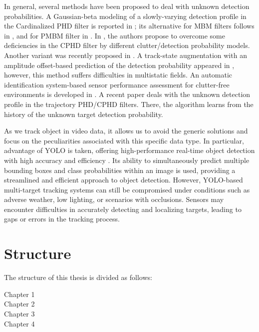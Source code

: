 In general, several methods have been proposed to deal with unknown detection probabilities. A Gaussian-beta modeling of a slowly-varying detection profile in the Cardinalized PHD filter is reported in \cite{Mahler2011cphd}; its alternative for MBM filters follows in \cite{Vo2013Robust}, and for PMBM filter in \cite{Kong2021Robust}. In \cite{Li2018PHD}, the authors propose to overcome some deficiencies in the CPHD filter \cite{Mahler2011cphd} by different clutter/detection probability models. Another variant was recently proposed in \cite{wei2023BGMPHD}. A track-state augmentation with an amplitude offset-based prediction of the detection probability appeared in \cite{Hanusa2013Track}, however, this method suffers difficulties in multistatic fields. An automatic identification system-based sensor performance assessment for clutter-free environments is developed in \cite{Horn2013Near}. A recent paper \cite{Wei2022Trajectory} deals with the unknown detection profile in the trajectory PHD/CPHD filters. There, the algorithm learns from the history of the unknown target detection probability.

As we track object in video data, it allows us to avoid the generic solutions and focus on the peculiarities associated with this specific data type. In particular, advantage of YOLO is taken, offering high-performance real-time object detection with high accuracy and efficiency \cite{yanYolo2023}. Its ability to simultaneously predict multiple bounding boxes and class probabilities within an image is used, providing a streamlined and efficient approach to object detection. However, YOLO-based multi-target tracking systems can still be compromised under conditions such as adverse weather, low lighting, or scenarios with occlusions. Sensors may encounter difficulties in accurately detecting and localizing targets, leading to gaps or errors in the tracking process.

\section{Structure}
The structure of this thesis is divided as follows:
\begin{description}
  \item[Chapter 1]

  \item[Chapter 2]
  \item[Chapter 3]

  \item[Chapter 4]
\end{description}